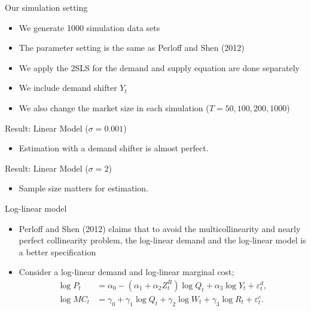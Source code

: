 \documentclass[aspectratio = 169]{beamer}
\theoremstyle{definition}
\begin{document}
\begin{frame}{Our simulation setting}
    \begin{itemize}
        \item We generate 1000 simulation data sets
        \item The parameter setting is the same as Perloff and Shen (2012)
        \item We apply the 2SLS for the demand and supply equation are done separately
        \item We include demand shifter $Y_t$
        \item We also change the market size in each simulation ($T = 50, 100, 200, 1000$)
    \end{itemize}
\end{frame}

\begin{frame}{Result: Linear Model ($\sigma = 0.001$)}
    \begin{table}[]
        \centering
        \tiny
        \label{tab:linear_with_demand_001}
    \end{table}
    \begin{itemize}
        \item Estimation with a demand shifter is almost perfect.
    \end{itemize}
\end{frame}

\begin{frame}{Result: Linear Model ($\sigma = 2$)}
    \begin{table}[]
        \centering
        \tiny
        \label{tab:linear_with_demand_2}
    \end{table}
    \begin{itemize}
        \item Sample size matters for estimation.
    \end{itemize}
\end{frame}



\begin{frame}{Log-linear model}
    \begin{itemize}
        \item Perloff and Shen (2012) claims that to avoid the multicollinearity and nearly perfect collinearity problem, the log-linear demand and the log-linear model is a better specification
        \item Consider a log-linear demand and log-linear marginal cost;
        \begin{align}
            \log P_{t} &= \alpha_0 - (\alpha_1 + \alpha_2 Z^{R}_{t}) \log Q_t + \alpha_3 \log Y_t + \varepsilon^{d}_{t},\label{eq:log_linear_demand}\\
            \log MC_t &= \gamma_0 + \gamma_1 \log Q_t +  \gamma_2 \log W_{t} + \gamma_3 \log R_t + \varepsilon^{c}_{t}.\label{eq:log_linear_marginal_cost}
        \end{align}
    \end{itemize}
\end{frame}
\end{document}
